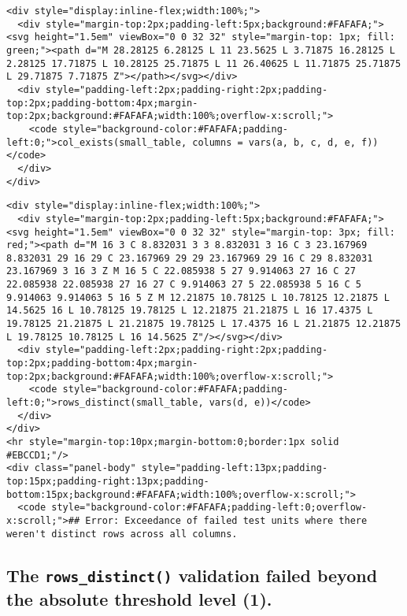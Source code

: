 \documentclass[
]{article}
\begin{document}
\begin{verbatim}
<div style="display:inline-flex;width:100%;">
  <div style="margin-top:2px;padding-left:5px;background:#FAFAFA;"><svg height="1.5em" viewBox="0 0 32 32" style="margin-top: 1px; fill: green;"><path d="M 28.28125 6.28125 L 11 23.5625 L 3.71875 16.28125 L 2.28125 17.71875 L 10.28125 25.71875 L 11 26.40625 L 11.71875 25.71875 L 29.71875 7.71875 Z"></path></svg></div>
  <div style="padding-left:2px;padding-right:2px;padding-top:2px;padding-bottom:4px;margin-top:2px;background:#FAFAFA;width:100%;overflow-x:scroll;">
    <code style="background-color:#FAFAFA;padding-left:0;">col_exists(small_table, columns = vars(a, b, c, d, e, f))</code>
  </div>
</div>
\end{verbatim}

\begin{verbatim}
<div style="display:inline-flex;width:100%;">
  <div style="margin-top:2px;padding-left:5px;background:#FAFAFA;"><svg height="1.5em" viewBox="0 0 32 32" style="margin-top: 3px; fill: red;"><path d="M 16 3 C 8.832031 3 3 8.832031 3 16 C 3 23.167969 8.832031 29 16 29 C 23.167969 29 29 23.167969 29 16 C 29 8.832031 23.167969 3 16 3 Z M 16 5 C 22.085938 5 27 9.914063 27 16 C 27 22.085938 22.085938 27 16 27 C 9.914063 27 5 22.085938 5 16 C 5 9.914063 9.914063 5 16 5 Z M 12.21875 10.78125 L 10.78125 12.21875 L 14.5625 16 L 10.78125 19.78125 L 12.21875 21.21875 L 16 17.4375 L 19.78125 21.21875 L 21.21875 19.78125 L 17.4375 16 L 21.21875 12.21875 L 19.78125 10.78125 L 16 14.5625 Z"/></svg></div>
  <div style="padding-left:2px;padding-right:2px;padding-top:2px;padding-bottom:4px;margin-top:2px;background:#FAFAFA;width:100%;overflow-x:scroll;">
    <code style="background-color:#FAFAFA;padding-left:0;">rows_distinct(small_table, vars(d, e))</code>
  </div>
</div>
<hr style="margin-top:10px;margin-bottom:0;border:1px solid #EBCCD1;"/>
<div class="panel-body" style="padding-left:13px;padding-top:15px;padding-right:13px;padding-bottom:15px;background:#FAFAFA;width:100%;overflow-x:scroll;">
  <code style="background-color:#FAFAFA;padding-left:0;overflow-x:scroll;">## Error: Exceedance of failed test units where there weren't distinct rows across all columns.
\end{verbatim}

\hypertarget{the-rows_distinct-validation-failed-beyond-the-absolute-threshold-level-1.}{%
\subsection{\texorpdfstring{The \texttt{rows\_distinct()} validation
failed beyond the absolute threshold level
(1).}{The rows\_distinct() validation failed beyond the absolute threshold level (1).}}\label{the-rows_distinct-validation-failed-beyond-the-absolute-threshold-level-1.}}
\end{document}
